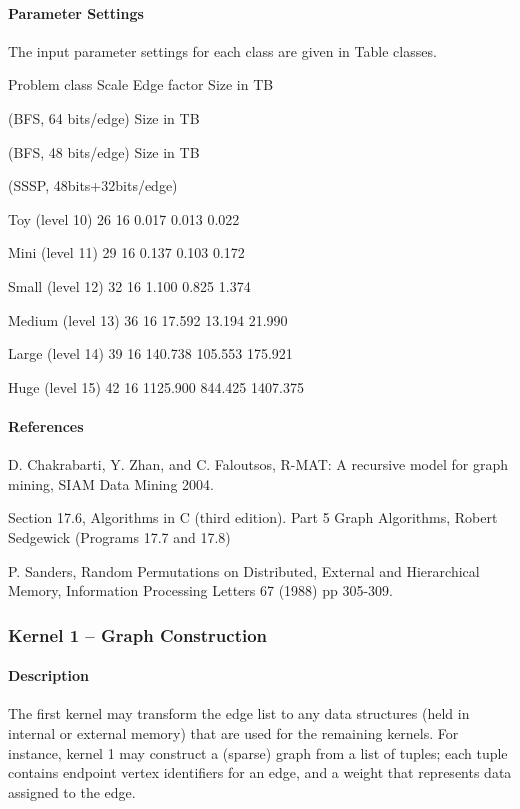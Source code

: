 \documentclass{article}
\begin{document}
\paragraph*{Parameter Settings}

The input parameter settings for each class are given in Table classes.

Problem class Scale Edge factor Size in TB

(BFS, 64 bits/edge) Size in TB

(BFS, 48 bits/edge) Size in TB

(SSSP, 48bits+32bits/edge)

Toy (level 10) 26 16 0.017 0.013 0.022

Mini (level 11) 29 16 0.137 0.103 0.172

Small (level 12) 32 16 1.100 0.825 1.374

Medium (level 13) 36 16 17.592 13.194 21.990

Large (level 14) 39 16 140.738 105.553 175.921

Huge (level 15) 42 16 1125.900 844.425 1407.375

\paragraph*{References}

D. Chakrabarti, Y. Zhan, and C. Faloutsos, R-MAT: A recursive model for graph mining, SIAM Data Mining 2004.

Section 17.6, Algorithms in C (third edition). Part 5 Graph Algorithms, Robert Sedgewick (Programs 17.7 and 17.8)

P. Sanders, Random Permutations on Distributed, External and Hierarchical Memory, Information Processing Letters 67 (1988) pp 305-309.

\subsubsection*{Kernel 1 -- Graph Construction}

\paragraph*{Description}

The first kernel may transform the edge list to any data structures (held in internal or external memory) that are used for the remaining kernels. For instance, kernel 1 may construct a (sparse) graph from a list of tuples; each tuple contains endpoint vertex identifiers for an edge, and a weight that represents data assigned to the edge.
\end{document}
